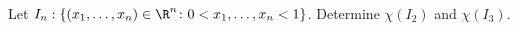 Let $I_{n}:\{(x_{1},\dots,x_{n})\in\R^{n}\colon 0<x_{1},\dots,x_{n}<1\}$. Determine $\chi(I_{2})$ and $\chi(I_{3})$. 

